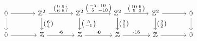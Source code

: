 \documentclass[12pt]{article}
\newcommand{\ZZ}{\mathbb{Z}}
\begin{document}
\begin{enumerate}
\[
\begin{tikzcd}[column sep=large,ampersand replacement=\&]
0 \arrow{r}\arrow{d} \&
\ZZ^{2} \arrow{d}{\left(\begin{smallmatrix} 6\\ 4 \end{smallmatrix} \right)} \arrow{r}{
 \left( \begin{smallmatrix} 9 & 9 \\ 6 & 6 \end{smallmatrix}  \right) } \& 
\ZZ^{2}  \arrow{d}{\left(\begin{smallmatrix} 5\\ -1 \end{smallmatrix} \right)} \arrow{r}{ \left( \begin{smallmatrix} -5 & 10 \\ 5 & -10 \end{smallmatrix}  \right) } \& 
\ZZ^{2}  \arrow{d}{\left(\begin{smallmatrix} 2\\ 1 \end{smallmatrix}
\right)} \arrow{r}{  \left( \begin{smallmatrix} 10 & 6 \\ 5 & 3 \end{smallmatrix} \right) } \&
\ZZ^{2}  \arrow{d}{\left(\begin{smallmatrix} 2\\ 2 \end{smallmatrix} \right)} \arrow{r} \& 0 \arrow{d} \\
0 \arrow{r} \&
\ZZ \arrow{r}{ \cdot 6 } \& 
\ZZ \arrow{r}{\cdot 0 } \& 
\ZZ \arrow{r}{ \cdot 16 } \&
\ZZ \arrow{r} \& 0 
\end{tikzcd}
\]



\end{enumerate}





          
\end{document}
